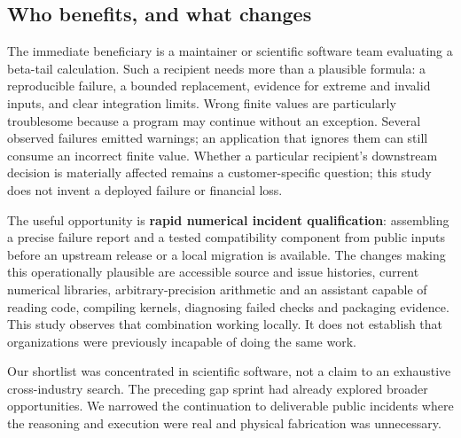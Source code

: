 \documentclass[
  10pt,
]{article}
\begin{document}
\hypertarget{who-benefits-and-what-changes}{%
\subsection{Who benefits, and what
changes}\label{who-benefits-and-what-changes}}

The immediate beneficiary is a maintainer or scientific software team
evaluating a beta-tail calculation. Such a recipient needs more than a
plausible formula: a reproducible failure, a bounded replacement,
evidence for extreme and invalid inputs, and clear integration limits.
Wrong finite values are particularly troublesome because a program may
continue without an exception. Several observed failures emitted
warnings; an application that ignores them can still consume an
incorrect finite value. Whether a particular recipient's downstream
decision is materially affected remains a customer-specific question;
this study does not invent a deployed failure or financial loss.

The useful opportunity is \textbf{rapid numerical incident
qualification}: assembling a precise failure report and a tested
compatibility component from public inputs before an upstream release or
a local migration is available. The changes making this operationally
plausible are accessible source and issue histories, current numerical
libraries, arbitrary-precision arithmetic and an assistant capable of
reading code, compiling kernels, diagnosing failed checks and packaging
evidence. This study observes that combination working locally. It does
not establish that organizations were previously incapable of doing the
same work.

Our shortlist was concentrated in scientific software, not a claim to an
exhaustive cross-industry search. The preceding gap sprint had already
explored broader opportunities. We narrowed the continuation to
deliverable public incidents where the reasoning and execution were real
and physical fabrication was unnecessary.
\end{document}
